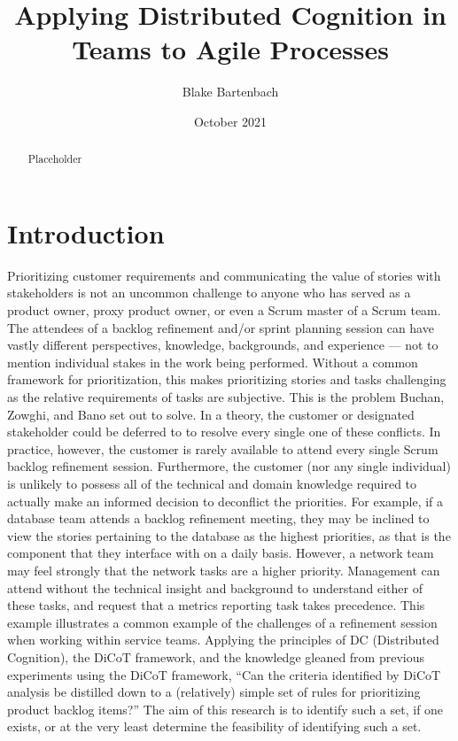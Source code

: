 \documentclass[acmsmall,screen]{acmart}
\begin{document}
\title{Applying Distributed Cognition in Teams to Agile Processes}

\author{Blake Bartenbach}
\date{October 2021}

\acmBooktitle{}

\begin{abstract}
Placeholder
\end{abstract}


\maketitle

\section{Introduction}
Prioritizing customer requirements and communicating the value of stories with stakeholders is not an uncommon challenge to anyone who has served as a product owner, proxy product owner, or even a Scrum master of a Scrum team. The attendees of a backlog refinement and/or sprint planning session can have vastly different perspectives, knowledge, backgrounds, and experience --- not to mention individual stakes in the work being performed. Without a common framework for prioritization, this makes prioritizing stories and tasks challenging as the relative requirements of tasks are subjective. This is the problem Buchan, Zowghi, and Bano set out to solve.
In a theory, the customer or designated stakeholder could be deferred to to resolve every single one of these conflicts. In practice, however, the customer is rarely available to attend every single Scrum backlog refinement session. Furthermore, the customer (nor any single individual) is unlikely to possess all of the technical and domain knowledge required to actually make an informed decision to deconflict the priorities.
For example, if a database team attends a backlog refinement meeting, they may be inclined to view the stories pertaining to the database as the highest priorities, as that is the component that they interface with on a daily basis. However, a network team may feel strongly that the network tasks are a higher priority. Management can attend without the technical insight and background to understand either of these tasks, and request that a metrics reporting task takes precedence. This example illustrates a common example of the challenges of a refinement session
when working within service teams.
Applying the principles of DC (Distributed Cognition), the DiCoT framework, and the knowledge gleaned from previous experiments using the DiCoT framework, ``Can the criteria identified by DiCoT analysis be distilled down to a (relatively) simple set of rules for prioritizing product backlog items?'' The aim of this research is to identify such a set, if one exists, or at the very least determine the feasibility of identifying such a set.
\end{document}
